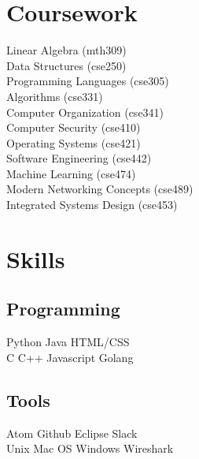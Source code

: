 \documentclass[]{deedy-resume-openfont}
\begin{document}
\begin{minipage}[t]{0.33\textwidth}
\section{Coursework}
Linear Algebra (mth309) \\
Data Structures (cse250) \\
Programming Languages (cse305) \\
Algorithms (cse331) \\
Computer Organization (cse341) \\
Computer Security (cse410) \\
Operating Systems (cse421) \\
Software Engineering (cse442) \\
Machine Learning (cse474) \\
Modern Networking Concepts (cse489) \\
Integrated Systems Design (cse453) \\
\sectionsep


\section{Skills}
\subsection{Programming}
Python \textbullet{}   Java \textbullet{} HTML/CSS \\
C \textbullet{} C++ \textbullet{} Javascript \textbullet{} Golang \\
\sectionsep

\subsection{Tools}
Atom \textbullet{} Github \textbullet{} Eclipse \textbullet{} Slack \\
Unix \textbullet{} Mac OS \textbullet{} Windows \textbullet{} Wireshark \\
\sectionsep
%
%

\end{minipage}
\hfill
\end{document}
